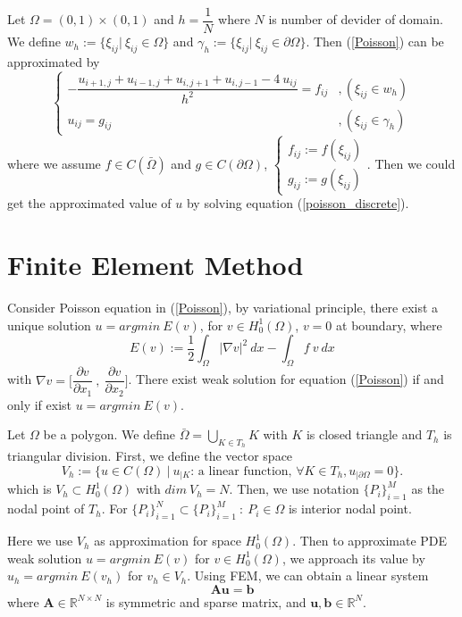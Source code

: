 \documentclass[]{article}
\newcommand{\R}{\mathbb{R}}
\begin{document}
Let $ \Omega = (0,1) \times (0,1) $ and $ h=\dfrac{1}{N} $ where $ N $ is number of devider of domain. We define $ w_{h} := \{ \xi_{ij} | \ \xi_{ij} \in \Omega \} $ and $ \gamma_{h} := \{ \xi_{ij} | \ \xi_{ij} \in \partial \Omega \} $. Then (\ref{Poisson}) can be approximated by
\begin{equation}\label{poisson_discrete}
\begin{cases}
- \dfrac{u_{i+1,j}+u_{i-1,j}+u_{i,j+1}+u_{i,j-1}-4 \ u_{ij}}{h^2} = f_{ij} &, (\xi_{ij}\in w_{h}) \\
u_{ij} = g_{ij} &,(\xi_{ij}\in\gamma_{h})
\end{cases}
\end{equation}
where we assume $ f \in C(\bar{\Omega}) $ and $ g \in C(\partial \Omega) $,
$ \begin{cases}
f_{ij} := f(\xi_{ij}) \\ g_{ij} := g(\xi_{ij})
\end{cases} $. Then we could get the approximated value of $ u $ by solving equation (\ref{poisson_discrete}).

\section{Finite Element Method}
Consider Poisson equation in (\ref{Poisson}), by variational principle, there exist a unique solution $ u = argmin \ E(v) $, for $ v \in H_{0}^{1}(\Omega) $, $ v=0 $ at boundary, where
\[ E(v) := \dfrac{1}{2} \int_{\Omega} |\nabla v|^2 \ dx - \int_{\Omega} f \ v \ dx \]
with $ \nabla v = \Big[ \dfrac{\partial v}{\partial x_{1}} \ , \ \dfrac{\partial v}{\partial x_{2}} \Big] $. There exist weak solution for equation (\ref{Poisson}) if and only if exist $ u = argmin \ E(v) $. 

Let $ \Omega $ be a polygon. We define $ \bar{\Omega} = \bigcup\limits_{K \in T_{h}} K $ with $ K $ is closed triangle and $ T_{h} $ is triangular division. First, we define the vector space
\[ V_{h} :=  \{ u \in C(\Omega) \ | \ u_{|K} \text{: a linear function, } \forall K \in T_{h}, u_{| \partial \Omega}=0 \}. \]
which is $ V_{h} \subset H_{0}^{1}(\Omega) $ with $ dim \ V_{h} = N $. Then, we use notation $ \{ P_{i} \}_{i=1}^{M} $ as the nodal point of $ T_{h} $. For $ \{ P_{i} \}_{i=1}^{N} \subset \{ P_{i} \}_{i=1}^{M} \ : \ P_{i} \in \Omega $ is interior nodal point.

Here we use $ V_{h} $ as approximation for space $ H_{0}^{1}(\Omega) $. Then to approximate PDE weak solution $ u = argmin \ E(v) $ for $ v \in H_{0}^{1}(\Omega) $, we approach its value by $ u_{h} = argmin \ E(v_{h}) $ for $ v_{h} \in V_{h} $. Using FEM, we can obtain a linear system
\begin{equation}\label{linear_sys}
\mathbf{A} \mathbf{u} = \mathbf{b}
\end{equation}
where $ \mathbf{A} \in \R^{N \times N} $ is symmetric and sparse matrix, and $ \mathbf{u}, \mathbf{b} \in \R^{N} $.
\end{document}
